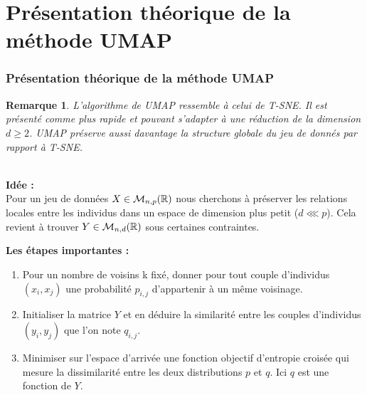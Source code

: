 \documentclass{beamer}
\newtheorem{rmq}{Remarque}
\theoremstyle{definition}
\begin{document}
\section{Présentation théorique de la méthode UMAP}
\begin{frame}
\frametitle{Présentation théorique de la méthode UMAP}
\begin{rmq}
	L'algorithme de UMAP ressemble à celui de T-SNE. Il est présenté comme plus rapide et pouvant s'adapter à une réduction de la dimension $d\geq2$. UMAP préserve aussi davantage la structure globale du jeu de donnés par rapport à T-SNE. %
\end{rmq}
\quad \\[0.15cm]
	\textcolor{modernvert}{\textbf{Idée :}}\\ Pour un jeu de données $X\in\mathcal{M}_{n,p}(\mathbb{R})$ nous cherchons à préserver les relations locales entre les individus dans un espace de dimension plus petit ($d \lll p$). Cela revient à trouver $Y\in\mathcal{M}_{n,d}(\mathbb{R})$ sous certaines contraintes.\\
	
	
\end{frame}

\begin{frame}
\textcolor{modernvert}{\textbf{Les étapes importantes :}}\\[0.5cm]
\begin{enumerate}
	\item  Pour un nombre de voisins k fixé, donner pour tout couple d'individus $(x_i,x_j)$ une probabilité $p_{i,j}$ d'appartenir à un même voisinage.
	\item Initialiser la matrice $Y$ et en déduire la similarité entre les couples d'individus $(y_i,y_j)$ que l'on note $q_{i,j}$.
	\item Minimiser sur l'espace d'arrivée une fonction objectif d’entropie croisée qui mesure la dissimilarité entre les deux distributions $p$ et $q$. Ici $q$ est une fonction de $Y$.
\end{enumerate}	
	
\end{frame}
\end{document}
